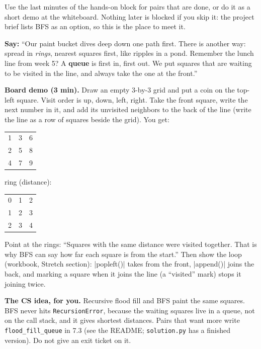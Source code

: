 \begin{teachernote}
Use the last minutes of the hands-on block for pairs that are done, or do it as a short demo at the whiteboard. Nothing later is blocked if you skip it: the project brief lists BFS as an option, so this is the place to meet it.

\textbf{Say:} \enquote{Our paint bucket dives deep down one path first. There is another way: spread in \emph{rings}, nearest squares first, like ripples in a pond. Remember the lunch line from week 5? A \textbf{queue} is first in, first out. We put squares that are waiting to be visited in the line, and always take the one at the front.}

\textbf{Board demo (3 min).} Draw an empty 3-by-3 grid and put a coin on the top-left square. Visit order is up, down, left, right. Take the front square, write the next number in it, and add its unvisited neighbors to the back of the line (write the line as a row of squares beside the grid). You get:

\begin{center}
\begin{tabular}{ccc}
1 & 3 & 6\\ 2 & 5 & 8\\ 4 & 7 & 9\\
\end{tabular}
\qquad ring (distance): \quad
\begin{tabular}{ccc}
0 & 1 & 2\\ 1 & 2 & 3\\ 2 & 3 & 4\\
\end{tabular}
\end{center}

Point at the rings: \enquote{Squares with the same distance were visited together. That is why BFS can say how far each square is from the start.} Then show the loop (workbook, Stretch section): \py|popleft()| takes from the front, \py|append()| joins the back, and marking a square when it joins the line (a \enquote{visited} mark) stops it joining twice.

\textbf{The CS idea, for you.} Recursive flood fill and BFS paint the same squares. BFS never hits \texttt{RecursionError}, because the waiting squares live in a queue, not on the call stack, and it gives shortest distances. Pairs that want more write \texttt{flood\_fill\_queue} in 7.3 (see the README; \texttt{solution.py} has a finished version). Do not give an exit ticket on it.
\end{teachernote}

